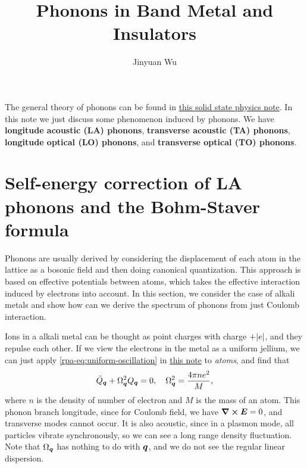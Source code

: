 \documentclass[hyperref, a4paper]{article}
\title{Phonons in Band Metal and Insulators}
\author{Jinyuan Wu}
\newcommand*{\concept}[1]{{\textbf{#1}}}
\newcommand{\soliddoc}{\href{../solid/solid.pdf}{this solid state physics note}}
\newcommand{\rpanote}{\href{./electron-gas.pdf}{this note}}
\begin{document}
\maketitle

The general theory of phonons can be found in \soliddoc. In this note we just discuss some phenomenon induced by 
phonons. We have \concept{longitude acoustic (LA) phonons}, \concept{transverse acoustic (TA) phonons},
\concept{longitude optical (LO) phonons}, and \concept{transverse optical (TO) phonons}.

\section{Self-energy correction of LA phonons and the Bohm-Staver formula}

Phonons are usually derived by considering the displacement of each atom in the lattice as a bosonic field and 
then doing canonical quantization. This approach is based on effective potentials between atoms, which takes the 
effective interaction induced by electrons into account. In this section, we consider the case of alkali metals
and show how can we derive the spectrum of phonons from just Coulomb interaction.

Ions in a alkali metal can be thought as point charges with charge $+\abs{e}$, and they repulse each other. 
If we view the electrons in the metal as a uniform jellium, we can just apply \eqref{rpa-eq:uniform-oscillation} in \rpanote
to \emph{atoms}, and find that 
\begin{equation}
    \ddot{Q}_{\vb*{q}} + \Omega^2_{\vb*{q}} Q_{\vb*{q}} = 0, \quad \Omega^2_{\vb*{q}} = \frac{4 \pi n e^2}{M},
\end{equation}
where $n$ is the density of number of electron and $M$ is the mass of an atom. 
This phonon branch longitude, since for Coulomb field, we have $\curl{\vb*{E}} = 0$, and transverse modes 
cannot occur. It is also acoustic, since in a plasmon mode, all particles vibrate synchronously, so we can see a long range density fluctuation.
Note that $\Omega_{\vb*{q}}$ has nothing to do with $\vb*{q}$, and we do not see the regular linear dispersion. 
\end{document}
